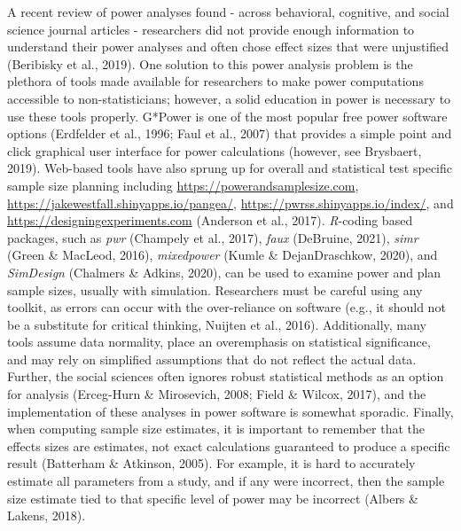 \documentclass[
  man]{apa7}
\begin{document}
A recent review of power analyses found - across behavioral, cognitive, and social science journal articles - researchers did not provide enough information to understand their power analyses and often chose effect sizes that were unjustified (Beribisky et al., 2019). One solution to this power analysis problem is the plethora of tools made available for researchers to make power computations accessible to non-statisticians; however, a solid education in power is necessary to use these tools properly. G*Power is one of the most popular free power software options (Erdfelder et al., 1996; Faul et al., 2007) that provides a simple point and click graphical user interface for power calculations (however, see Brysbaert, 2019). Web-based tools have also sprung up for overall and statistical test specific sample size planning including \url{https://powerandsamplesize.com}, \url{https://jakewestfall.shinyapps.io/pangea/}, \url{https://pwrss.shinyapps.io/index/}, and \url{https://designingexperiments.com} (Anderson et al., 2017). \emph{R}-coding based packages, such as \emph{pwr} (Champely et al., 2017), \emph{faux} (DeBruine, 2021), \emph{simr} (Green \& MacLeod, 2016), \emph{mixedpower} (Kumle \& DejanDraschkow, 2020), and \emph{SimDesign} (Chalmers \& Adkins, 2020), can be used to examine power and plan sample sizes, usually with simulation. Researchers must be careful using any toolkit, as errors can occur with the over-reliance on software (e.g., it should not be a substitute for critical thinking, Nuijten et al., 2016). Additionally, many tools assume data normality, place an overemphasis on statistical significance, and may rely on simplified assumptions that do not reflect the actual data. Further, the social sciences often ignores robust statistical methods as an option for analysis (Erceg-Hurn \& Mirosevich, 2008; Field \& Wilcox, 2017), and the implementation of these analyses in power software is somewhat sporadic. Finally, when computing sample size estimates, it is important to remember that the effects sizes are estimates, not exact calculations guaranteed to produce a specific result (Batterham \& Atkinson, 2005). For example, it is hard to accurately estimate all parameters from a study, and if any were incorrect, then the sample size estimate tied to that specific level of power may be incorrect (Albers \& Lakens, 2018).
\end{document}

